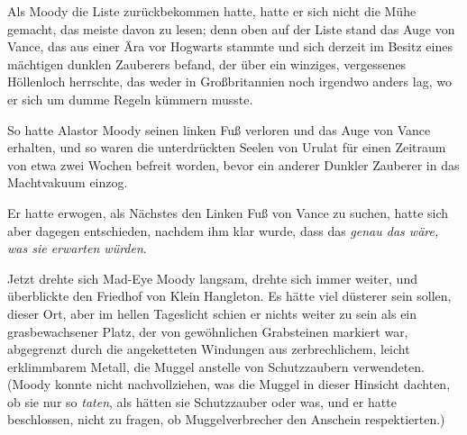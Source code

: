 Als Moody die Liste zurückbekommen hatte, hatte er sich nicht die Mühe gemacht, das meiste davon zu lesen; denn oben auf der Liste stand das Auge von Vance, das aus einer Ära vor Hogwarts stammte und sich derzeit im Besitz eines mächtigen dunklen Zauberers befand, der über ein winziges, vergessenes Höllenloch herrschte, das weder in Großbritannien noch irgendwo anders lag, wo er sich um dumme Regeln kümmern musste.

So hatte Alastor Moody seinen linken Fuß verloren und das Auge von Vance erhalten, und so waren die unterdrückten Seelen von Urulat für einen Zeitraum von etwa zwei Wochen befreit worden, bevor ein anderer Dunkler Zauberer in das Machtvakuum einzog.

Er hatte erwogen, als Nächstes den Linken Fuß von Vance zu suchen, hatte sich aber dagegen entschieden, nachdem ihm klar wurde, dass das \emph{genau das wäre, was sie erwarten würden}.

Jetzt drehte sich Mad-Eye Moody langsam, drehte sich immer weiter, und überblickte den Friedhof von Klein Hangleton. Es hätte viel düsterer sein sollen, dieser Ort, aber im hellen Tageslicht schien er nichts weiter zu sein als ein grasbewachsener Platz, der von gewöhnlichen Grabsteinen markiert war, abgegrenzt durch die angeketteten Windungen aus zerbrechlichem, leicht erklimmbarem Metall, die Muggel anstelle von Schutzzaubern verwendeten. (Moody konnte nicht nachvollziehen, was die Muggel in dieser Hinsicht dachten, ob sie nur so \emph{taten}, als hätten sie Schutzzauber oder was, und er hatte beschlossen, nicht zu fragen, ob Muggelverbrecher den Anschein respektierten.)

